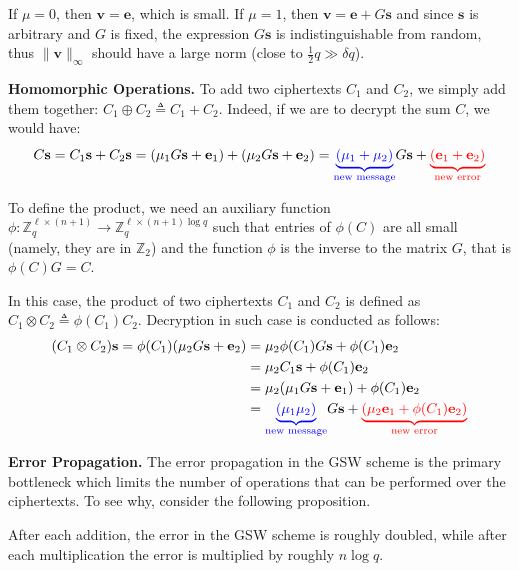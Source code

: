 \documentclass{iacrtrans}
\begin{document}
If $\mu=0$, then $\mathbf{v} = \mathbf{e}$, which is small. If $\mu=1$, then
$\mathbf{v} = \mathbf{e} + G\mathbf{s}$ and since $\mathbf{s}$ is arbitrary and
$G$ is fixed, the expression $G\mathbf{s}$ is indistinguishable from random,
thus $\|\mathbf{v}\|_{\infty}$ should have a large norm (close to
$\frac{1}{2}q \gg \delta q$).

\textbf{Homomorphic Operations.} To add two ciphertexts $C_1$ and $C_2$, we
simply add them together: $C_1 \oplus C_2 \triangleq C_1 + C_2$. Indeed, if we are to 
decrypt the sum $C$, we would have:
\begin{equation*}
    C\mathbf{s} = C_1\mathbf{s} + C_2\mathbf{s} = (\mu_1 G\mathbf{s}+\mathbf{e}_1) + (\mu_2 G\mathbf{s} + \mathbf{e}_2)
    = \textcolor{blue}{\underbrace{(\mu_1+\mu_2)}_{\text{new message}}}G\mathbf{s} + \textcolor{red}{\underbrace{(\mathbf{e}_1+\mathbf{e}_2)}_{\text{new error}}}
\end{equation*}

To define the product, we need an auxiliary function $\phi: \mathbb{Z}_q^{\ell
\times (n+1)} \to \mathbb{Z}_q^{\ell \times (n+1)\log q}$ such that entries of 
$\phi(C)$ are all small (namely, they are in $\mathbb{Z}_2$) and the function 
$\phi$ is the inverse to the matrix $G$, that is $\phi(C)G=C$. 

In this case, the product of two ciphertexts $C_1$ and $C_2$ is defined as $C_1
\otimes C_2 \triangleq \phi(C_1)C_2$. Decryption in such case is conducted as follows:
\begin{align*}
    (C_1 \otimes C_2)\mathbf{s} = \phi(C_1)(\mu_2 G\mathbf{s} + \mathbf{e}_2) &= \mu_2 \phi(C_1)G\mathbf{s} + \phi(C_1)\mathbf{e}_2 \\
    &= \mu_2C_1 \mathbf{s} + \phi(C_1)\mathbf{e}_2 \\
    &= \mu_2(\mu_1 G\mathbf{s} + \mathbf{e}_1) + \phi(C_1)\mathbf{e}_2\\
    &= \textcolor{blue}{\underbrace{(\mu_1\mu_2)}_{\text{new message}}}G\mathbf{s} + 
    \textcolor{red}{\underbrace{(\mu_2\mathbf{e}_1 + \phi(C_1)\mathbf{e}_2)}_{\text{new error}}}
\end{align*}

\textbf{Error Propagation.} The error propagation in the GSW scheme is the
primary bottleneck which limits the number of operations that can be performed
over the ciphertexts. To see why, consider the following proposition.

\begin{proposition}
    After each addition, the error in the GSW scheme is roughly doubled, while
    after each multiplication the error is multiplied by roughly $n\log q$. 
\end{proposition}
\end{document}
